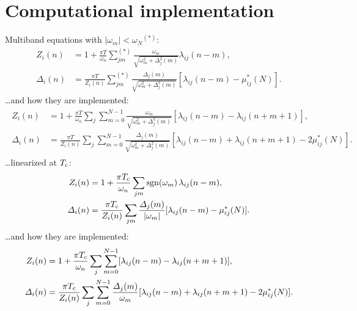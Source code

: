\section{Computational implementation}

Multiband  equations with $|\omega_m| < \omega_N{}^{(*)}$:
%
\begin{equation*}
   \begin{split}
      Z_i(n) &= 1 + \frac{\pi T}{\omega_n} \sum_{j m}^{(*)}
      \frac{\omega_m}{\sqrt{\omega_m^2 + \Delta_j^2(m)}}
      \lambda_{i j}(n - m),
      \\
      \Delta_i(n) &= \frac{\pi T}{Z_i(n)} \sum_{j m}^{(*)}
      \frac{\Delta_j(m)}{\sqrt{\omega_m^2 + \Delta_j^2(m)}}
      [\lambda_{i j}(n - m) - \mu^*_{i j}(N)].
   \end{split}
\end{equation*}
%
\dots and how they are implemented:
%
\begin{align}
   \begin{split}
      Z_i(n) &= 1 + \frac{\pi T}{\omega_n} \sum_j \sum_{m = 0}^{N - 1}
      \frac{\omega_m}{\sqrt{\omega_m^2 + \Delta_j^2(m)}}
      [\lambda_{i j}(n - m) - \lambda_{i j}(n + m + 1)],
      \\
      \Delta_i(n) &= \frac{\pi T}{Z_i(n)} \sum_j \sum_{m = 0}^{N - 1}
      \frac{\Delta_j(m)}{\sqrt{\omega_m^2 + \Delta_j^2(m)}}
      [\lambda_{i j}(n - m) + \lambda_{i j}(n + m + 1) - 2 \mu^*_{i j}(N)].
   \end{split}
\end{align}
%
\dots linearized at $T \sb{\text{c}}$:
%
\begin{equation*}
   \begin{split}
      Z_i(n) &= 1 + \frac{\pi T \sb{\text{c}}}{\omega_n} \sum_{j m}
      \operatorname{sgn}(\omega_m) \, \lambda_{i j}(n - m),
      \\
      \varDelta_i(n) &= \frac{\pi T \sb{\text{c}}}{Z_i(n)} \sum_{j m}
      \frac{\varDelta_j(m)}{|\omega_m|}
      [\lambda_{i j}(n - m) - \mu^*_{i j}(N)].
   \end{split}
\end{equation*}
%
\dots and how they are implemented:
%
\begin{equation*}
   \begin{split}
      Z_i(n) &= 1 + \frac{\pi T \sb{\text{c}}}{\omega_n} \sum_j \sum_{m = 0}^{N - 1}
      [\lambda_{i j}(n - m) - \lambda_{i j}(n + m + 1)],
      \\
      \varDelta_i(n) &= \frac{\pi T \sb{\text{c}}}{Z_i(n)} \sum_j \sum_{m = 0}^{N - 1}
      \frac{\varDelta_j(m)}{\omega_m}
      [\lambda_{i j}(n - m) + \lambda_{i j}(n + m + 1) - 2 \mu^*_{i j}(N)].
   \end{split}
\end{equation*}

